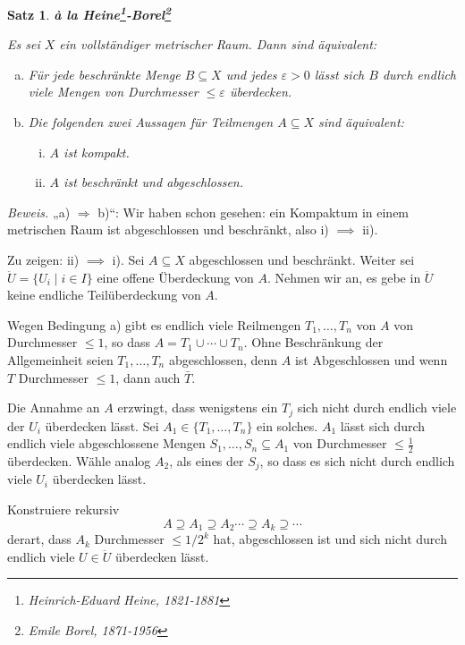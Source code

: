 \documentclass[12pt]{scrbook}   %
\newtheorem{satzX}[alles]{Satz}
\newenvironment{satz}[1]{\begin{satzX}{\bf #1}\nopagebreak\par}{\end{satzX}}
\begin{document}
\begin{satz}{\`a la Heine\footnote{Heinrich-Eduard Heine, 1821-1881}-Borel\footnote{Emile Borel, 1871-1956}}
\label{heineborel}

Es sei $X$ ein vollständiger metrischer Raum. Dann sind äquivalent:

\begin{enumerate}[a)]
\item Für jede beschränkte
Menge $B\subseteq X$ und jedes $\varepsilon>0$ lässt sich $B$ durch endlich viele
Mengen von Durchmesser $\leq \varepsilon$ überdecken.

\item Die folgenden zwei Aussagen für Teilmengen $A\subseteq X$ sind äquivalent:
\begin{enumerate}[i)]
\item $A$ ist kompakt.
\item $A$ ist beschränkt und abgeschlossen.
\end{enumerate}

\end{enumerate}

\end{satz}

{\it Beweis.} 
„a) $\Longrightarrow$ b)“:
Wir haben schon gesehen: ein Kompaktum 
in einem metrischen Raum ist abgeschlossen und beschränkt, also i) $\implies$ ii).

Zu zeigen: ii) $\implies$ i). Sei $A\subseteq X$ abgeschlossen und beschränkt. Weiter sei 
$\ddot U = \{U_i \mid i\in I\}$ eine offene Überdeckung von $A$. Nehmen wir an, es gebe in 
$\ddot U$ keine endliche Teilüberdeckung von $A$.

Wegen Bedingung a) gibt es endlich viele Reilmengen $T_1,\ldots,T_n$ von $A$ von Durchmesser $\le 1$, so dass $A=T_1\cup\cdots\cup T_n$. Ohne Beschränkung der Allgemeinheit seien $T_1,\ldots,T_n$ abgeschlossen, denn $A$ ist Abgeschlossen und wenn $T$ Durchmesser $\le1$, dann auch $\bar T$.

Die Annahme an $A$ erzwingt, dass wenigstens ein $T_j$ sich nicht durch endlich viele der $U_i$ überdecken lässt. Sei $A_1 \in \{T_1,\ldots,T_n\}$ ein solches. $A_1$ lässt sich durch endlich viele abgeschlossene Mengen $S_1,\ldots,S_n\subseteq A_1$ von Durchmesser $\le \frac12$ überdecken. Wähle analog $A_2$, als eines der $S_j$, so dass es sich nicht durch endlich viele $U_i$ überdecken lässt.

Konstruiere rekursiv
$$A\supseteq A_1\supseteq A_2\cdots \supseteq A_k\supseteq \cdots$$
derart, dass $A_k$ Durchmesser $\leq 1/2^k$ hat, abgeschlossen ist und sich nicht durch endlich 
viele $U\in \ddot U$ überdecken lässt. 
\end{document}
